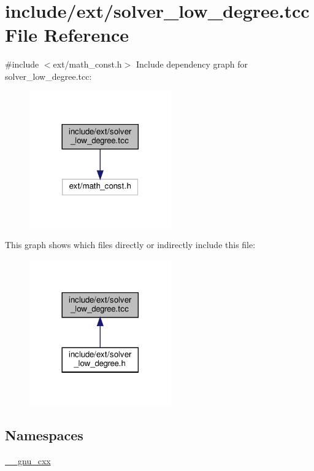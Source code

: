\hypertarget{solver__low__degree_8tcc}{}\section{include/ext/solver\+\_\+low\+\_\+degree.tcc File Reference}
\label{solver__low__degree_8tcc}
{\ttfamily \#include $<$ext/math\+\_\+const.\+h$>$}\newline
Include dependency graph for solver\+\_\+low\+\_\+degree.\+tcc\+:
\nopagebreak
\begin{figure}[H]
\begin{center}
\leavevmode
\includegraphics[width=173pt]{solver__low__degree_8tcc__incl}
\end{center}
\end{figure}
This graph shows which files directly or indirectly include this file\+:
\nopagebreak
\begin{figure}[H]
\begin{center}
\leavevmode
\includegraphics[width=173pt]{solver__low__degree_8tcc__dep__incl}
\end{center}
\end{figure}
\subsection*{Namespaces}
\begin{DoxyCompactItemize}
\item 
 \hyperlink{namespace____gnu__cxx}{\+\_\+\+\_\+gnu\+\_\+cxx}
\end{DoxyCompactItemize}

